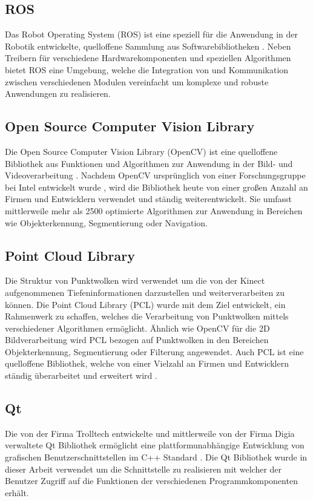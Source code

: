 \subsection{ROS}
\label{chap:ros}
Das Robot Operating System (ROS) ist eine speziell für die Anwendung in der Robotik entwickelte, quelloffene Sammlung aus Softwarebibliotheken \cite{ROS}. Neben Treibern für verschiedene Hardwarekomponenten und speziellen Algorithmen bietet ROS eine Umgebung, welche die Integration von und Kommunikation zwischen verschiedenen Modulen vereinfacht um komplexe und robuste Anwendungen zu realisieren. 

\subsection{Open Source Computer Vision Library}
Die Open Source Computer Vision Library (OpenCV) ist eine quelloffene Bibliothek aus Funktionen und Algorithmen zur Anwendung in der Bild- und Videoverarbeitung \cite{OpenCV}. Nachdem OpenCV ursprünglich von einer Forschungsgruppe bei Intel entwickelt wurde \cite{Laganiere2011}, wird die Bibliothek heute von einer großen Anzahl an Firmen und Entwicklern verwendet und ständig weiterentwickelt. Sie umfasst mittlerweile mehr als 2500 optimierte Algorithmen zur Anwendung in Bereichen wie Objekterkennung, Segmentierung oder Navigation.

\subsection{Point Cloud Library}
Die Struktur von Punktwolken wird verwendet um die von der Kinect aufgenommenen Tiefeninformationen darzustellen und weiterverarbeiten zu können. Die Point Cloud Library (PCL) wurde mit dem Ziel entwickelt, ein Rahmenwerk zu schaffen, welches die Verarbeitung von Punktwolken mittels verschiedener Algorithmen ermöglicht. Ähnlich wie OpenCV für die 2D Bildverarbeitung wird PCL bezogen auf Punktwolken in den Bereichen Objekterkennung, Segmentierung oder Filterung angewendet. Auch PCL ist eine quelloffene Bibliothek, welche von einer Vielzahl an Firmen und Entwicklern ständig überarbeitet und erweitert wird \cite{PCL}.

\subsection{Qt}
Die von der Firma Trolltech entwickelte und mittlerweile von der Firma Digia verwaltete Qt Bibliothek ermöglicht eine plattformunabhängige Entwicklung von grafischen Benutzerschnittstellen im C++ Standard \cite{Qt}. Die Qt Bibliothek wurde in dieser Arbeit verwendet um die Schnittstelle zu realisieren mit welcher der Benutzer Zugriff auf die Funktionen der verschiedenen Programmkomponenten erhält.

